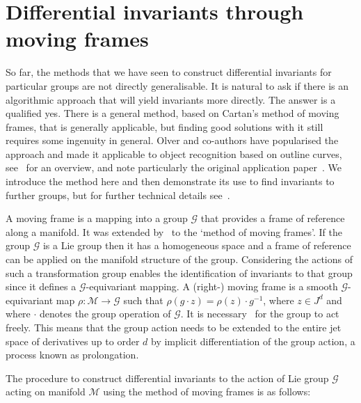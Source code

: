 \documentclass[review,onefignum,onetabnum]{siamonline190516}
\begin{document}
\section{Differential invariants through moving frames}\label{sec:movingframes}

So far, the methods that we have seen to construct differential invariants for particular groups are not directly generalisable. It is natural to ask if there is an algorithmic approach that will yield invariants more directly. The answer is a qualified yes. There is a general method, based on Cartan's method of moving frames, that is generally applicable, but finding good solutions with it still requires some ingenuity in general. Olver and co-authors have popularised the approach and made it applicable to object recognition based on outline curves, see~\citet{Olver2005} for an overview, and note particularly the original application paper~\citep{Calabi1998}.  We introduce the method here and then demonstrate its use to find invariants to further groups, but for further technical details see~\citet{OlverCIT}. 

A moving frame is a mapping into a group $\mathcal{G}$ that provides a frame of reference along a manifold.  It was extended by~\citet{Cartan35} to the `method of moving frames'. If the group $\mathcal{G}$ is a Lie group then it has a homogeneous space and a frame of reference can be applied on the manifold structure of the group. Considering the actions of such a transformation group enables the identification of invariants to that group since it defines a $\mathcal{G}$-equivariant mapping. A (right-) moving frame is a smooth $\mathcal{G}$-equivariant map $\rho : \mathcal{M} \to \mathcal{G}$ such that $\rho (g \cdot z) = \rho(z) \cdot g^{-1}$, where $z \in J^d$ and where $\cdot$ denotes the group operation of $\mathcal{G}$. It is necessary~\citep{Olver2013} for the group to act freely. This means that the group action needs to be extended to the entire jet space of derivatives up to order $d$ by implicit differentiation of the group action, a process known as prolongation.

The procedure to construct differential invariants to the action of Lie group $\mathcal{G}$ acting on manifold $\mathcal{M}$ using the method of moving frames is as follows:
\end{document}
